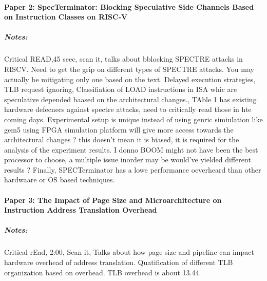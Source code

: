 \documentclass{article}
\begin{document}
\paragraph{Paper 2: SpecTerminator: Blocking Speculative Side Channels Based on Instruction Classes on RISC-V}
\subparagraph{Notes:}Critical READ,45 seec, scan it, talks about bblocking SPECTRE attacks in RISCV. Need to get the grip on different types of SPECTRE attacks. You may actually be mitigating only one based on the text. Delayed execution strategies, TLB request ignoring, Classifiation of LOAD instructions in ISA whic are speculative depended baased on the architectural changes., TAble 1 has existing hardware defecnecs against spectre attacks, need to critically read those in hte coming days. Experimental setup is unique instead of using genric simiulation like gem5 using FPGA simulation platform will give more access towards the architectural changes ? this doesn’t mean it is biased, it is required for the analysis of the experiment results. I donno BOOM might not have been the best processor to choose, a multiple issue inorder may be would’ve yielded different results ? Finally, SPECTerminator has a lowe performance ocverheard than other hardwaare or OS based techniques.
\paragraph{Paper 3: The Impact of Page Size and Microarchitecture on Instruction Address Translation Overhead}
\subparagraph{Notes: }Critical rEad, 2:00, Scan it, Talks about how page size and pipeline can impact hardware overhead of address translation. Quatification of different TLB organization based on overhead. TLB overhead is about 13.44%
\nocite{*}


% 
\end{document}
